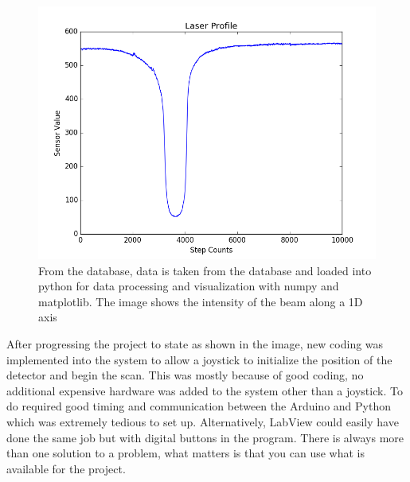 \documentclass[11pt,a4paper]{book}
\begin{document}
		\begin{figure} [!ht]
			\centering
			\def\svgwidth{\columnwidth}
			\Huge
			\includegraphics[scale=0.60]{images/chapter-1/sample_plot_data_with_sql_numpy_matplotlib}
			\caption{From the database, data is taken from the database and loaded into python for data processing and visualization with numpy and matplotlib. The image shows the intensity of the beam along a 1D axis}
			\label{fig:sample_plot_data_with_sql_numpy_matplotlib}
		\end{figure}
		
		After progressing the project to state as shown in the image, new coding was implemented into the system to allow a joystick to initialize the position of the detector and begin the scan. This was mostly because of good coding, no additional expensive hardware was added to the system other than a joystick. To do required good timing and communication between the Arduino and Python which was extremely tedious to set up. Alternatively, LabView could easily have done the same job but with digital buttons in the program. There is always more than one solution to a problem, what matters is that you can use what is available for the project.
		
\end{document}

